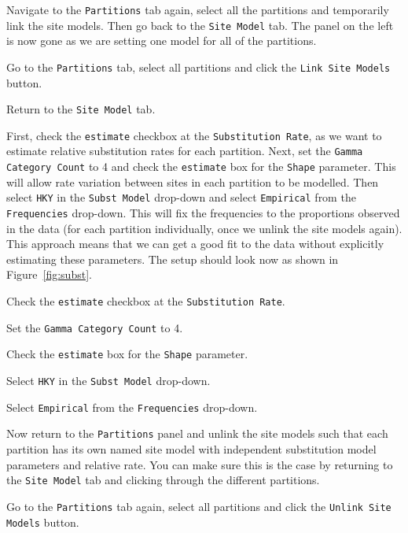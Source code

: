 \documentclass[11pt]{article}
\begin{document}
Navigate to the \texttt{Partitions} tab again, select all the partitions and temporarily link the site models. Then go back to the \texttt{Site Model} tab. The panel on the left is now gone as we are setting one model for all of the partitions.

\begin{framed}
Go to the \texttt{Partitions} tab, select all partitions and click the \texttt{Link Site Models} button.

Return to the \texttt{Site Model} tab.
\end{framed}

First, check the \texttt{estimate} checkbox at the \texttt{Substitution Rate}, as we want to estimate relative substitution rates for each partition. Next, set the \texttt{Gamma Category Count} to 4 and check the \texttt{estimate} box for the \texttt{Shape} parameter. This will allow rate variation between sites in each partition to be modelled. Then select \texttt{HKY} in the \texttt{Subst Model} drop-down and select \texttt{Empirical} from the \texttt{Frequencies} drop-down. This will fix the frequencies to the proportions observed in the data (for each partition individually, once we unlink the site models again). This approach means that we can get a good fit to the data without explicitly estimating these parameters. The setup should look now as shown in Figure~\ref{fig:subst}.

\begin{framed}
Check the \texttt{estimate} checkbox at the \texttt{Substitution Rate}.

Set the \texttt{Gamma Category Count} to 4.

Check the \texttt{estimate} box for the \texttt{Shape} parameter.

Select \texttt{HKY} in the \texttt{Subst Model} drop-down.

Select \texttt{Empirical} from the \texttt{Frequencies} drop-down.
\end{framed}

Now return to the \texttt{Partitions} panel and unlink the site models such that each partition has its own named site model with independent substitution model parameters and relative rate. You can make sure this is the case by returning to the \texttt{Site Model} tab and clicking through the different partitions. 

\begin{framed}
Go to the \texttt{Partitions} tab again, select all partitions and click the \texttt{Unlink Site Models} button.
\end{framed}
\end{document}
